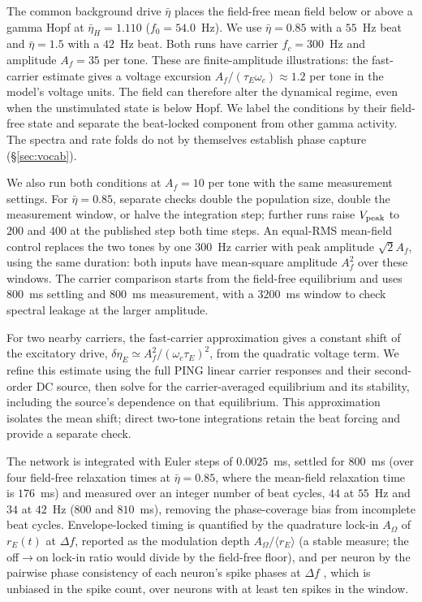 \documentclass[11pt,a4paper]{article}
\providecommand{\DIFaddtex}[1]{{\protect\color{blue} \sf #1}} %
\providecommand{\DIFdeltex}[1]{{\protect\color{red} \scriptsize #1}} %
\providecommand{\DIFaddbegin}{} %
\providecommand{\DIFaddend}{} %
\providecommand{\DIFdelbegin}{} %
\providecommand{\DIFdelend}{} %
\providecommand{\DIFadd}[1]{\texorpdfstring{\DIFaddtex{#1}}{#1}} %
\providecommand{\DIFdel}[1]{\texorpdfstring{\DIFdeltex{#1}}{}} %
\begin{document}
The common background drive $\bar\eta$ places the field-free mean field below or
above a gamma Hopf at $\bar\eta_H=1.110$ ($f_0=54.0$~Hz). We use
$\bar\eta=0.85$ with a $55$~Hz beat and $\bar\eta=1.5$ with a $42$~Hz beat.
Both runs have carrier $f_c=300$~Hz and amplitude $A_f=35$ per tone. These are
finite-amplitude illustrations: the fast-carrier estimate gives a voltage excursion
$A_f/(\tau_E\omega_c)\approx1.2$ per tone in the model's voltage units. The field
can therefore alter the dynamical regime, even when the unstimulated state is below
Hopf. We label the conditions by their field-free state and separate the beat-locked
component from other gamma activity. The spectra and rate folds do not by themselves
establish phase capture (\S\ref{sec:vocab}).

We also run both conditions at $A_f=10$ per tone with the same measurement
settings. For $\bar\eta=0.85$, separate checks double the population size,
double the measurement window, or halve the integration step; further runs raise
$V_{\rm peak}$ to $200$ and $400$ at \DIFdelbegin \DIFdel{the published step}\DIFdelend \DIFaddbegin \DIFadd{both time steps}\DIFaddend . An equal-RMS
mean-field control replaces the two tones by one $300$~Hz carrier with peak
amplitude $\sqrt{2}A_f$, using the same duration: both inputs have mean-square
amplitude $A_f^2$ over these windows. The carrier comparison starts from the
field-free equilibrium and uses $800$~ms settling and $800$~ms measurement,
with a $3200$~ms window to check spectral leakage at the larger amplitude.

For two nearby carriers, the fast-carrier approximation gives a constant shift
of the excitatory drive, $\delta\eta_E\simeq A_f^2/(\omega_c\tau_E)^2$, from the
quadratic voltage term. We refine this estimate using the full PING linear carrier
responses and their second-order DC source, then solve for the carrier-averaged
equilibrium and its stability, including the source's dependence on that equilibrium.
This approximation isolates the mean shift; direct two-tone integrations retain
the beat forcing and provide a separate check.

The network is integrated with Euler steps of $0.0025$~ms, settled for $800$~ms (over
four field-free relaxation times at $\bar\eta=0.85$, where the mean-field relaxation time is
$176$~ms) and measured over an integer number of beat cycles, $44$ at $55$~Hz and $34$ at
$42$~Hz ($800$ and $810$~ms), removing the phase-coverage bias from incomplete
beat cycles. Envelope-locked timing is quantified by the quadrature lock-in $A_\Omega$ of
$r_E(t)$ at $\Delta f$, reported as the modulation depth $A_\Omega/\langle r_E\rangle$ (a
stable measure; the off$\to$on lock-in ratio would divide by the field-free floor), and
per neuron by the pairwise phase consistency of each neuron's spike phases at $\Delta f$
\cite{vinck2010}, which is unbiased in the spike count, over neurons with at least ten
spikes in the window.
\end{document}
